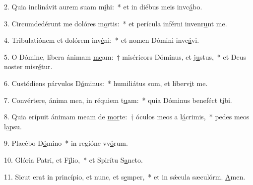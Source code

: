 2. Quia inclinávit aurem suam m\uline{i}hi:~* et in diébus meis invc\uline{á}bo.\par 
3. Circumdedérunt me dolóres m\uline{o}rtis:~* et perícula inférni invenr\uline{u}nt me.\par 
4. Tribulatiónem et dolórem inv\uline{é}ni:~* et nomen Dómini invc\uline{á}vi.\par 
5. O Dómine, líbera ánimam \uline{me}am:~† miséricors Dóminus, et j\uline{u}stus,~* et Deus noster misr\uline{é}tur.\par 
6. Custódiens párvulos D\uline{ó}minus:~* humiliátus sum, et liberv\uline{i}t me.\par 
7. Convértere, ánima mea, in réquiem t\uline{u}am:~* quia Dóminus beneféct t\uline{i}bi.\par 
8. Quia erípuit ánimam meam de \uline{mor}te:~† óculos meos a l\uline{á}crimis,~* pedes meos  l\uline{a}psu.\par 
9. Placébo D\uline{ó}mino~* in regióne vv\uline{ó}rum.\par 
10. Glória Patri, et F\uline{í}lio,~* et Spirítu S\uline{a}ncto.\par 
11. Sicut erat in princípio, et nunc, et s\uline{e}mper,~* et in sǽcula sæculórm. \uline{A}men.\par 

